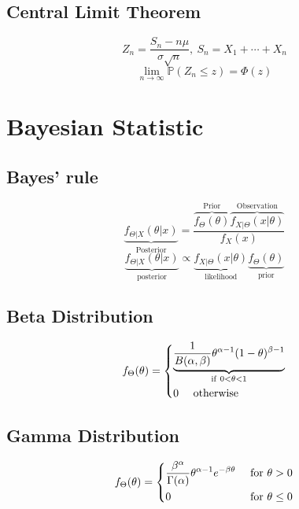 \documentclass[10pt,landscape,a4paper]{article}
\begin{document}
\begin{multicols}{4}
\subsection*{Central Limit Theorem}
\[
  Z_n = \dfrac{S_n - n\mu}{\sigma\sqrt{n}},\  S_n = X_1 + \cdots + X_n
\]
\[
  \lim_{n \to \infty} \mathbb{P}(Z_n \leq z) = \varPhi (z)
\]

\section*{Bayesian Statistic}
\subsection*{Bayes' rule}
\[
  \underbrace{f_{\Theta \vert X} (\theta \vert x)}_{\text{Posterior}} = \dfrac{\overbrace{f_{\Theta} (\theta)}^{\text{Prior}} \overbrace{f_{X \vert \Theta} (x \vert \theta)}^{\text{Observation}}}{f_X (x)}
\]
\[
  \underbrace{f_{\Theta \vert X} (\theta \vert x)}_{\text{posterior}} \propto \underbrace{f_{X \vert \Theta} (x \vert \theta)}_{\text{likelihood}} \underbrace{f_{\Theta} (\theta)}_{\text{prior}}
\]

\subsection*{Beta Distribution}
\[
  f_{\Theta} (\theta) = \begin{dcases}
    \underbrace{\dfrac{1}{B(\alpha, \beta)} \theta^{\alpha-1} (1 - \theta)^{\beta - 1}}_{\text{if}\ 0 < \theta < 1} \\
    0 \quad \text{ otherwise} 
  \end{dcases}
\]

\subsection*{Gamma Distribution}
\[
  f_{\Theta} (\theta) = \begin{dcases}
    \dfrac{\beta^{\alpha}}{\Gamma (\alpha)}\theta^{\alpha - 1} e^{-\beta\theta} &\text{ for } \theta > 0 \\
    0 &\text{ for } \theta \leq 0 \\
  \end{dcases}
\]

\vfill\break
\end{multicols}
\end{document}
